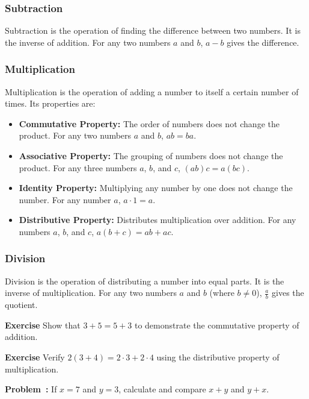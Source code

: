\documentclass[a4paper,12pt]{book}
\newenvironment{exercise}[1][]
  {\par\medskip\noindent\textbf{Exercise #1} \rmfamily}
  {\medskip}
\newcounter{problem}
\newenvironment{problem}[1][\theproblem]
{\refstepcounter{problem}\par\medskip\noindent\textbf{Problem~#1:} \rmfamily}{\medskip}
\begin{document}
\subsubsection{Subtraction}
Subtraction is the operation of finding the difference between two numbers. It is the inverse of addition. For any two numbers \( a \) and \( b \), \( a - b \) gives the difference.


\subsubsection{Multiplication}
Multiplication is the operation of adding a number to itself a certain number of times. Its properties are:
\begin{itemize}
    \item \textbf{Commutative Property:} The order of numbers does not change the product. For any two numbers \( a \) and \( b \), \( ab = ba \).
    \item \textbf{Associative Property:} The grouping of numbers does not change the product. For any three numbers \( a \), \( b \), and \( c \), \( (ab)c = a(bc) \).
    \item \textbf{Identity Property:} Multiplying any number by one does not change the number. For any number \( a \), \( a \cdot 1 = a \).
    \item \textbf{Distributive Property:} Distributes multiplication over addition. For any numbers \( a \), \( b \), and \( c \), \( a(b + c) = ab + ac \).
\end{itemize}


\subsubsection{Division}
Division is the operation of distributing a number into equal parts. It is the inverse of multiplication. For any two numbers \( a \) and \( b \) (where \( b \neq 0 \)), \( \frac{a}{b} \) gives the quotient.


\begin{exercise}
Show that \( 3 + 5 = 5 + 3 \) to demonstrate the commutative property of addition.
\end{exercise}


\begin{exercise}
Verify \( 2(3 + 4) = 2 \cdot 3 + 2 \cdot 4 \) using the distributive property of multiplication.
\end{exercise}


\begin{problem}
If \( x = 7 \) and \( y = 3 \), calculate and compare \( x + y \) and \( y + x \).
\end{problem}
\end{document}

